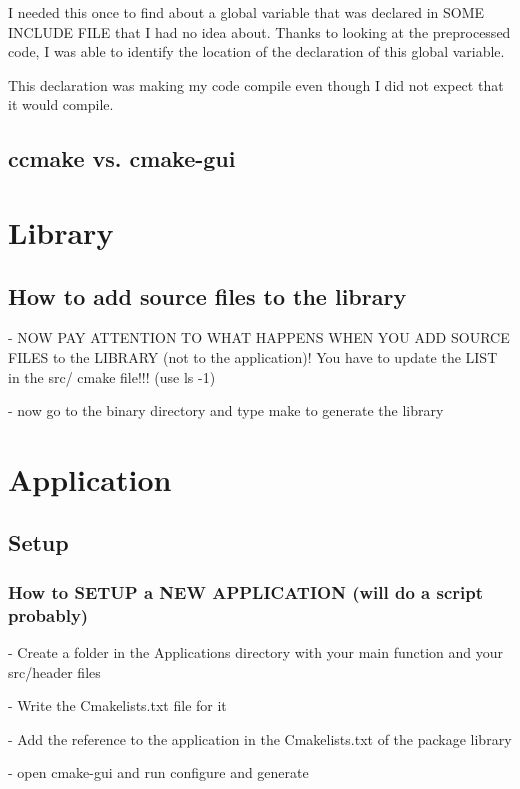 \documentclass[10pt]{book}
\begin{document}
  I needed this once to find about a global variable that was declared in SOME INCLUDE FILE
  that I had no idea about. Thanks to looking at the preprocessed code, I was able to identify
  the location of the declaration of this global variable.
  
  This declaration was making my code compile even though I did not expect that it would compile.
  

\chapter{ccmake vs. cmake-gui}


\part{Library}


 \chapter{How to add source files to the library}
 
- NOW PAY ATTENTION TO WHAT HAPPENS WHEN YOU ADD SOURCE FILES to the LIBRARY (not to the application)! You have to 
update the LIST in the src/ cmake file!!! (use ls -1)

- now go to the binary directory and type make to generate the library



\part{Application}


 \chapter{Setup}
  
  
\section{How to SETUP a NEW APPLICATION (will do a script probably)}

- Create a folder in the Applications directory with your main function and your src/header files

- Write the Cmakelists.txt file for it

- Add the reference to the application in the Cmakelists.txt of the package library

- open cmake-gui and run configure and generate
\end{document}
